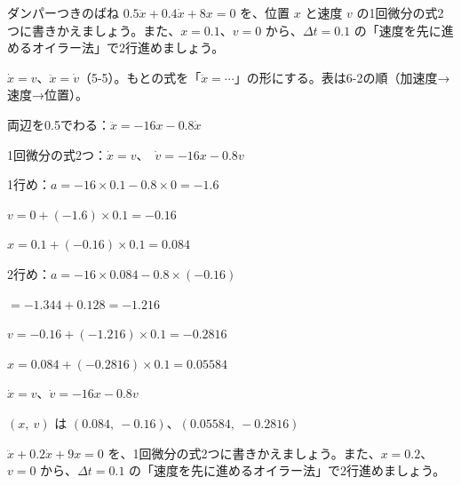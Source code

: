 \begin{reidai}
ダンパーつきのばね $0.5\ddot x+0.4\dot x+8x=0$ を、位置 $x$ と速度 $v$ の1回微分の式2つに書きかえましょう。また、$x=0.1$、$v=0$ から、$\Delta t=0.1$ の「速度を先に進めるオイラー法」で2行進めましょう。\par
\kangaekata $\dot x=v$、$\ddot x=\dot v$（5-5）。もとの式を「$\ddot x=\cdots$」の形にする。表は6-2の順（加速度→速度→位置）。\par
\shiki\kvios{}\zw{} 両辺を0.5でわる：$\ddot x=-16x-0.8\dot x$\par
\kvioa 1回微分の式2つ：$\dot x=v$、\ $\dot v=-16x-0.8v$\par
\kvioa 1行め：$a=-16\times0.1-0.8\times0=-1.6$\par
\kviob $v=0+(-1.6)\times0.1=-0.16$\par
\kviob $x=0.1+(-0.16)\times0.1=0.084$\par
\kvioa 2行め：$a=-16\times0.084-0.8\times(-0.16)$\par
\kviob $=-1.344+0.128=-1.216$\par
\kviob $v=-0.16+(-1.216)\times0.1=-0.2816$\par
\kviob $x=0.084+(-0.2816)\times0.1=0.05584$\par
\kotae\kvios{}\zw{} $\dot x=v$、$\dot v=-16x-0.8v$\par
\kvioa $(x,\ v)$ は $(0.084,\ -0.16)$、$(0.05584,\ -0.2816)$
\end{reidai}

\begin{jibun}
$\ddot x+0.2\dot x+9x=0$ を、1回微分の式2つに書きかえましょう。また、$x=0.2$、$v=0$ から、$\Delta t=0.1$ の「速度を先に進めるオイラー法」で2行進めましょう。
\end{jibun}

